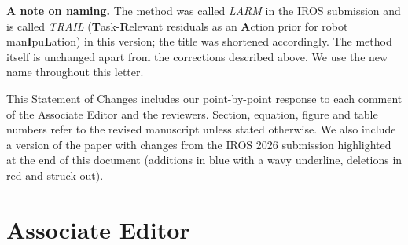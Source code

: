 \documentclass[11pt,a4paper]{article}
\begin{document}
\vspace{2pt}
\noindent
\textbf{A note on naming.} The method was called \emph{LARM} in the IROS submission and is called
\emph{TRAIL} (\textbf{T}ask-\textbf{R}elevant residuals as an \textbf{A}ction prior for robot
man\textbf{I}pu\textbf{L}ation) in this version; the title was shortened accordingly. The method
itself is unchanged apart from the corrections described above. We use the new name throughout this
letter.

\vspace{2pt}
\noindent
This Statement of Changes includes our point-by-point response to each comment of the Associate
Editor and the reviewers. Section, equation, figure and table numbers refer to the revised
manuscript unless stated otherwise.
We also include a version of the paper with changes from the IROS 2026 submission highlighted at the end of this document (additions in blue with a wavy underline, deletions in red and struck out).

\section{Associate Editor}
\end{document}
